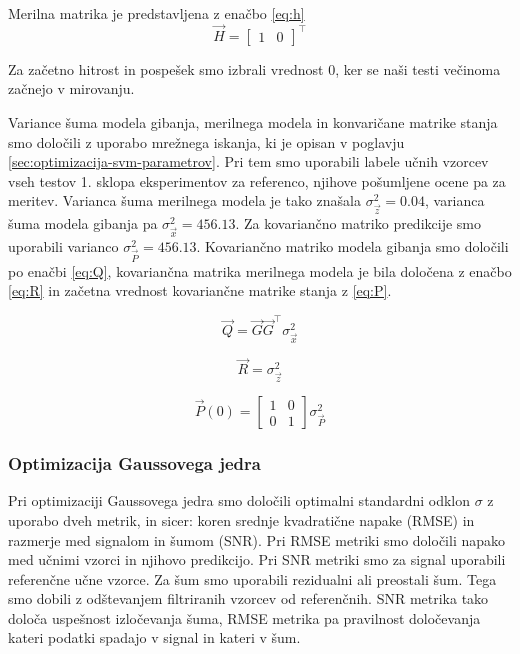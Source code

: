 Merilna matrika je predstavljena z enačbo \eqref{eq:h}
\begin{equation}
\vec{H} = \begin{bmatrix}
				1 & 0
			\end{bmatrix}^\top 
            \label{eq:h}
\end{equation}

Za začetno hitrost in pospešek smo izbrali vrednost $0$, ker se naši testi večinoma začnejo v mirovanju. 

Variance šuma modela gibanja, merilnega modela in konvaričane matrike stanja smo določili z uporabo mrežnega iskanja, ki je opisan v poglavju \ref{sec:optimizacija-svm-parametrov}. Pri tem smo uporabili labele učnih vzorcev vseh testov 1. sklopa eksperimentov za referenco, njihove pošumljene ocene pa za meritev. Varianca šuma merilnega modela je tako znašala $\sigma_\vec{z}^2 = 0.04$, varianca šuma modela gibanja pa $\sigma_\vec{x}^2 = 456.13$. Za kovariančno matriko predikcije smo uporabili varianco $\sigma_\vec{P}^2 = 456.13$. Kovariančno matriko modela gibanja smo določili po enačbi \eqref{eq:Q}, kovariančna matrika merilnega modela je bila določena z enačbo \eqref{eq:R} in začetna vrednost kovariančne matrike stanja z \eqref{eq:P}.

\begin{equation}
\vec{Q} = \vec{G} \vec{G}^\top \sigma_\vec{x}^2
\label{eq:Q}
\end{equation}

\begin{equation}
\vec{R} = \sigma_\vec{z}^2
\label{eq:R}
\end{equation}

\begin{equation}
\vec{P}(0) = \begin{bmatrix}
1 & 0 \\
0 & 1
\end{bmatrix} \sigma_\vec{P}^2
\label{eq:P}
\end{equation}





\subsubsection{Optimizacija Gaussovega jedra}
Pri optimizaciji Gaussovega jedra smo določili optimalni standardni odklon $\sigma$ z uporabo dveh metrik, in sicer: koren srednje kvadratične napake (RMSE) in razmerje med signalom in šumom (SNR). Pri RMSE metriki smo določili napako med učnimi vzorci in njihovo predikcijo. Pri SNR metriki smo za signal uporabili referenčne učne vzorce. Za šum smo uporabili rezidualni ali preostali šum. Tega smo dobili z odštevanjem filtriranih vzorcev od referenčnih. SNR metrika tako določa uspešnost izločevanja šuma, RMSE metrika pa pravilnost določevanja kateri podatki spadajo v signal in kateri v šum.


